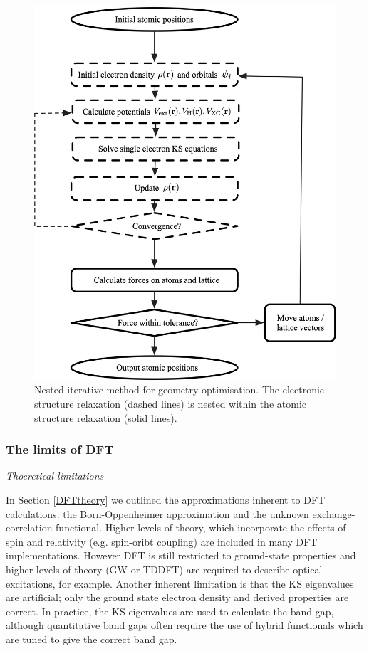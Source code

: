 \begin{figure}[h]
\centering
  \includegraphics[width=1.0\columnwidth]{figures/ch3/scf.png}
  \caption[Nested iterative method for geometry optimisation]{Nested iterative method for geometry optimisation. The electronic structure relaxation (dashed lines) is nested within the atomic structure relaxation (solid lines).} 
  \label{SCF}
\end{figure}
\subsubsection{The limits of DFT}

\textit{Thoeretical limitations}

In Section \ref{DFTtheory} we outlined the approximations inherent to DFT calculations: the Born-Oppenheimer approximation and the unknown exchange-correlation functional. Higher levels of theory, which incorporate the effects of spin and relativity (e.g. spin-oribt coupling) are included in many DFT implementations. However DFT is still restricted to ground-state properties and higher levels of theory (GW or TDDFT) are required to describe optical excitations, for example. Another inherent limitation is that the KS eigenvalues are artificial; only the ground state electron density and derived properties are correct. In practice, the KS eigenvalues are used to calculate the band gap, although quantitative band gaps often require the use of hybrid functionals which are tuned to give the correct band gap.

